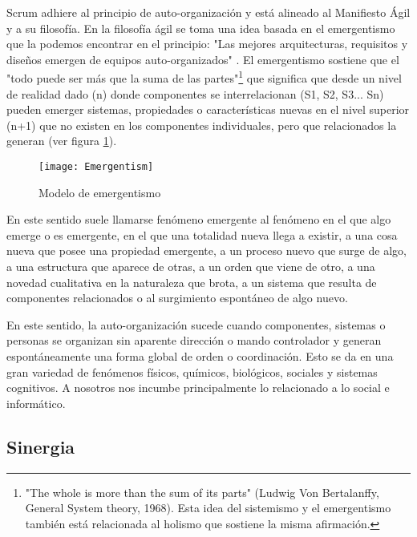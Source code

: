 Scrum adhiere al principio de auto-organización y está alineado al Manifiesto Ágil y a su filosofía. En la filosofía ágil se toma una idea basada en el emergentismo que la podemos encontrar en el principio: "Las mejores arquitecturas, requisitos y diseños emergen de equipos auto-organizados" \cite{Beck-2001}. El emergentismo sostiene que el "todo puede ser más que la suma de las partes"\footnote{"The whole is more than the sum of its parts" (Ludwig Von Bertalanffy, General System theory, 1968). Esta idea del sistemismo y el emergentismo también está relacionada al holismo que sostiene la misma afirmación.} que significa que desde un nivel de realidad dado (n) donde componentes se interrelacionan (S1, S2, S3... Sn) pueden emerger sistemas, propiedades o características nuevas en el nivel superior (n+1) que no existen en los componentes individuales, pero que relacionados la generan (ver figura \ref{fig:Emergentism}). 

\begin{figure}[h]
  \centering
  \texttt{[image: Emergentism]}
  \caption{Modelo de emergentismo}
  \centering
  \label{fig:Emergentism} %
\end{figure}
\FloatBarrier %

En este sentido suele llamarse fenómeno emergente al fenómeno en el que algo emerge o es emergente, en el que una totalidad nueva llega a existir, a una cosa nueva que posee una propiedad emergente, a un proceso nuevo que surge de algo, a una estructura que aparece de otras, a un orden que viene de otro, a una novedad cualitativa en la naturaleza que brota, a un sistema que resulta de componentes relacionados o al surgimiento espontáneo de algo nuevo.

En este sentido, la auto-organización sucede cuando componentes, sistemas o personas se organizan sin aparente dirección o mando controlador y generan espontáneamente una forma global de orden o coordinación. Esto se da en una gran variedad de fenómenos físicos, químicos, biológicos, sociales y sistemas cognitivos. A nosotros nos incumbe principalmente lo relacionado a lo social e informático. 

\subsection{Sinergia}

